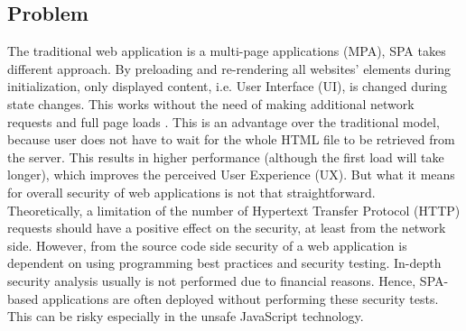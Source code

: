 \documentclass{article} %
\begin{document}
\subsection{Problem}
The traditional web application is a multi-page applications (MPA), SPA takes different approach. By preloading and re-rendering all websites' elements during initialization, only displayed content, i.e. User Interface (UI), is changed during state changes. This works without the need of making additional network requests and full page loads \cite{bib:preloaded}. This is an advantage over the traditional model, because user does not have to wait for the whole HTML file to be retrieved from the server. This results in higher performance (although the first load will take longer), which improves the perceived User Experience (UX). But what it means for overall security of web applications is not that straightforward.\\
\newline
Theoretically, a limitation of the number of Hypertext Transfer Protocol (HTTP) requests should have a positive effect on the security, at least from the network side. However, from the source code side security of a web application is dependent on using programming best practices and security testing. In-depth security analysis usually is not performed due to financial reasons. Hence, SPA-based applications are often deployed without performing these security tests. This can be risky especially in the unsafe JavaScript technology.
\end{document}
